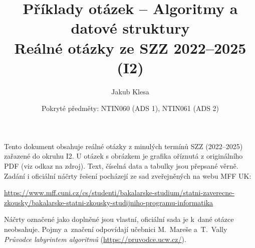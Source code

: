 \documentclass[11pt,a4paper]{article}
\title{Příklady otázek -- Algoritmy a datové struktury\\[0.3em]\large Reálné otázky ze SZZ 2022--2025 (I2)}
\author{Jakub Klesa}
\date{Pokryté předměty: NTIN060 (ADS 1), NTIN061 (ADS 2)}
\begin{document}
\maketitle
\tableofcontents
\bigskip

\begin{poznamka}
Tento dokument obsahuje reálné otázky z minulých termínů SZZ (2022--2025) zařazené do
okruhu I2. U otázek s obrázkem je grafika oříznutá z originálního PDF (viz odkaz na
zdroj). Text, číselná data a tabulky jsou přepsané věrně.
Zadání i oficiální náčrty řešení pocházejí ze sad zveřejněných na webu MFF UK:\par
{\raggedright\url{https://www.mff.cuni.cz/cs/studenti/bakalarske-studium/statni-zaverecne-zkousky/bakalarske-statni-zkousky-studijniho-programu-informatika}\par}
Náčrty označené jako doplněné jsou vlastní, oficiální sada je k~dané otázce neobsahuje.
Pojmy a~značení odpovídají učebnici M.~Mareše a~T.~Vally \emph{Průvodce labyrintem algoritmů}
(\url{https://pruvodce.ucw.cz/}).
\end{poznamka}
\bigskip






\end{document}

